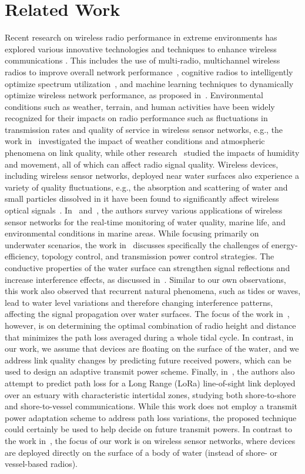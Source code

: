 \section{Related Work}
\label{sec:related}

Recent research on wireless radio performance in extreme environments has explored various innovative technologies and techniques to enhance wireless communications \cite{Renzone9361700}. This includes the use of multi-radio, multichannel wireless radios to improve overall network performance~\cite{10.1109/mascot.2009.5366718}, cognitive radios to intelligently optimize spectrum utilization~\cite{10.1155/2018/4173810}, and machine learning techniques to dynamically optimize wireless network performance, as proposed in~\cite{giordano2022design, 10.1587/comex.2018xbl0061}. Environmental conditions such as weather, terrain, and human activities have been widely recognized for their impacts on radio performance such as fluctuations in transmission rates and quality of service in wireless sensor networks, e.g., the work in~\cite{10.5194/acp-9-2413-2009} investigated the impact of weather conditions and atmospheric phenomena on link quality, while other research~\cite{10.1145/1089444.1089466} studied the impacts of humidity and movement, all of which can affect radio signal quality. Wireless devices, including wireless sensor networks, deployed near water surfaces also experience a variety of quality fluctuations, e.g., the absorption and scattering of water and small particles dissolved in it have been found to significantly affect wireless optical signals~\cite{10.18280/mmep.080316}. In~\cite{10.1016/j.jart.2017.07.004} and~\cite{10.3390/s140916932}, the authors survey various applications of wireless sensor networks for the real-time monitoring of water quality, marine life, and environmental conditions in marine areas. While focusing primarily on underwater scenarios, the work in~\cite{10.1155/2017/7539751} discusses specifically the challenges of energy-efficiency, topology control, and transmission power control strategies. The conductive properties of the water surface can strengthen signal reflections and increase interference effects, as discussed in~\cite{9706046}. Similar to our own observations, this work also observed that recurrent natural phenomena, such as tides or waves, lead to water level variations and therefore changing interference patterns, affecting the signal propagation over water surfaces. The focus of the work in~\cite{9706046}, however, is on determining the optimal combination of radio height and distance that minimizes the path loss averaged during a whole tidal cycle. In contrast, in our work, we assume that devices are floating on the surface of the water, and we address link quality changes by predicting future received powers, which can be used to design an adaptive transmit power scheme. Finally, in~\cite{9894283}, the authors also attempt to predict path loss for a Long Range (LoRa) line-of-sight link deployed over an estuary with characteristic intertidal zones, studying both shore-to-shore and shore-to-vessel communications. While this work does not employ a transmit power adaptation scheme to address path loss variations, the proposed technique could certainly be used to help decide on future transmit powers. In contrast to the work in~\cite{9894283}, the focus of our work is on wireless sensor networks, where devices are deployed directly on the surface of a body of water (instead of shore- or vessel-based radios).



